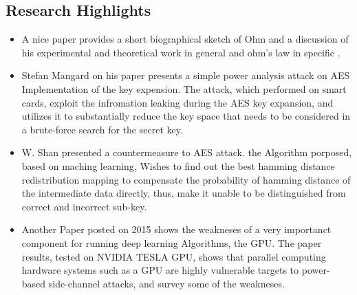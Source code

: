\subsection { Research Highlights }

\begin{itemize}
    \item A nice paper provides a short biographical sketch of Ohm and a discussion of his experimental and theoretical work in general and ohm's law in specific \cite{gupta1980georg}.
    \item Stefan Mangard on his paper \cite{mangard2002simple} presents a simple power analysis attack on AES Implementation of the key expension.
    The attack, which performed on smart cards, exploit the infromation leaking during the AES key expansion, 
    and utilizes it to substantially reduce the key space that needs to be considered in a brute-force search for the secret key.
    \item W. Shan \cite{shan2017machine} presented a countermeasure to AES attack. the Algorithm porposed, based
    on maching learning, Wishes to find out the best hamming distance redistribution mapping to compensate the probability of hamming distance of the intermediate data directly,
    thus, make it unable to be distinguished from correct and incorrect sub-key.
    \item Another Paper posted on 2015 \cite{luo2015side} shows the weakneses of a very importanct component for running deep learning Algorithms, the GPU.
    The paper results, tested on NVIDIA TESLA GPU, shows that parallel computing hardware systems such as a GPU are highly vulnerable targets to power-based side-channel attacks,
    and survey some of the weakneses.
\end{itemize}


   

